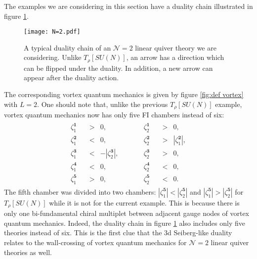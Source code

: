 \documentclass[a4paper,11pt]{article}
\begin{document}
The examples we are considering in this section have a duality chain illustrated in figure \ref{fig:N=2}.
%
\begin{figure}[tbp]
\centering %
\texttt{[image: N=2.pdf]}
\caption{\label{fig:N=2} A typical duality chain of an $\mathcal N = 2$ linear quiver theory we are considering. Unlike $T_\rho [SU(N)]$, an arrow has a direction which can be flipped under the duality. In addition, a new arrow can appear after the duality action.}
\end{figure}
%
The corresponding vortex quantum mechanics is given by figure \ref{fig:def vortex} with $L = 2$.
One should note that, unlike the previous $T_\rho [SU(N)]$ example, vortex quantum mechanics now has only five FI chambers instead of six:
\begin{align}
\label{eq:N=2 FI}
\begin{array}{ccccccc}
\zeta^{\mathbf 1}_1 \quad &>& 0, &\qquad& \zeta^{\mathbf 1}_2 \quad &>& 0, \\
\zeta^{\mathbf 2}_1 \quad &<& 0, &\qquad& \zeta^{\mathbf 2}_2 \quad &>& |\zeta^{\mathbf 2}_1|, \\
\zeta^{\mathbf 3}_1 \quad &<& -|\zeta^{\mathbf 3}_2|, &\qquad& \zeta^{\mathbf 3}_2 \quad &>& 0, \\
\zeta^{\mathbf 4}_1 \quad &<& 0, &\qquad& \zeta^{\mathbf 4}_2 \quad &<& 0, \\
\zeta^{\mathbf 5}_1 \quad &>& 0, &\qquad& \zeta^{\mathbf 5}_2 \quad &<& 0.
\end{array}
\end{align}
The fifth chamber was divided into two chambers: $|\zeta^{\mathbf 5}_1| < |\zeta^{\mathbf 5}_2|$ and $|\zeta^{\mathbf 5}_1| > |\zeta^{\mathbf 5}_2|$ for $T_\rho [SU(N)]$ while it is not for the current example. This is because there is only one bi-fundamental chiral multiplet between adjacent gauge nodes of vortex quantum mechanics. Indeed, the duality chain in figure \ref{fig:N=2} also includes only five theories instead of six. This is the first clue that the 3d Seiberg-like duality relates to the wall-crossing of vortex quantum mechanics for $\mathcal N = 2$ linear quiver theories as well.
\\
\end{document}
